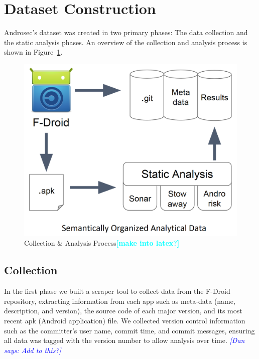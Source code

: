 \documentclass[journal,transmag]{IEEEtran}
\newcommand{\todo}[1]{\textcolor{cyan}{\textbf{[#1]}}}
\newcommand{\dan}[1]{\textcolor{blue}{{\it [Dan says: #1]}}}
\begin{document}
\section{Dataset Construction}
\label{sec: datasetconstruction}
Androsec's dataset was created in two primary phases: The data collection and the static analysis phases. An overview of the collection and analysis process is shown in Figure~\ref{fig:ap}.

\begin{figure}[tbph]
\centering
\vspace{-0.2cm}
\includegraphics[scale=.18]{./images/process.png}


\caption{Collection \& Analysis Process\todo{make into latex?}}
\vspace{-0.2cm}
\label{fig:ap}
\end{figure}

\subsection{Collection}
In the first phase we built a scraper tool to collect data from the F-Droid repository, extracting information from each app such as meta-data (name, description, and version), the source code of each major version, and its most recent apk (Android application) file. We collected version control information such as the committer's user name, commit time, and commit messages, ensuring all data was tagged with the version number to allow analysis over time. \dan{Add to this?}
\end{document}
